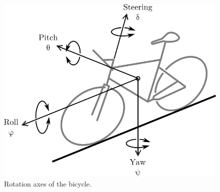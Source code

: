 \documentclass{article}
\begin{document}
\begin{figure}
    \centering
    \includegraphics[scale=1.0]{bike-dof.png}
    \caption{Rotation axes of the bicycle.}
    \label{fig: bike-dof}
\end{figure}
\end{document}
